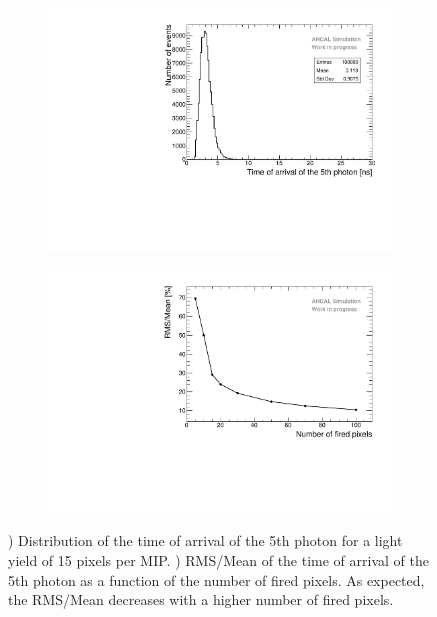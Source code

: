 \begin{figure}[htbp!]
	\begin{subfigure}[t]{0.49\textwidth}
		\centering
		\includegraphics[width=1\textwidth]{../Thesis_Plots/Timing/Muons/Plots/TimeArrival5thPhoton_MCToy.pdf}
		\caption{}\label{fig:time_arrival5th}
	\end{subfigure}
	\hfill
	\begin{subfigure}[t]{0.49\textwidth}
		\centering
		\includegraphics[width=1\textwidth]{../Thesis_Plots/Timing/Muons/Plots/TimeArrival5thPhoton_MCToy_Npe.pdf}
		\caption{}\label{fig:time_arrival5th_LY}
	\end{subfigure}
	\caption{) Distribution of the time of arrival of the 5th photon for a light yield of 15 pixels per MIP. ) RMS/Mean of the time of arrival of the 5th photon as a function of the number of fired pixels. As expected, the RMS/Mean decreases with a higher number of fired pixels.}
\end{figure}

